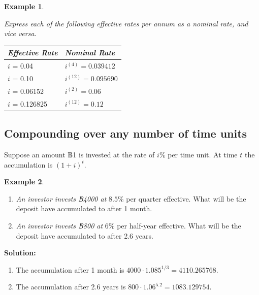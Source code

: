 \documentclass[
]{book}
\theoremstyle{definition}
\theoremstyle{definition}
\newtheorem{example}{Example}[chapter]
\theoremstyle{definition}
\theoremstyle{definition}
\theoremstyle{remark}
\begin{document}
\begin{example}
\protect\hypertarget{exm:unlabeled-div-14}{}\label{exm:unlabeled-div-14}

\emph{Express each of the following effective rates per annum as a nominal
rate, and vice versa.}

\begin{longtable}[]{@{}ll@{}}
\toprule
\textbf{\emph{Effective Rate}} & \textbf{\emph{Nominal Rate}} \\
\midrule
\endhead
\(i\) = 0.04 & \(i^{(4)} = 0.039412\) \\
\(i\) = 0.10 & \(i^{(12)} = 0.095690\) \\
\(i\) = 0.06152 & \(i^{(2)} = 0.06\) \\
\(i\) = 0.126825 & \(i^{(12)} = 0.12\) \\
\bottomrule
\end{longtable}

\end{example}

\hypertarget{compounding-over-any-number-of-time-units}{%
\subsection{Compounding over any number of time units}\label{compounding-over-any-number-of-time-units}}

Suppose an amount ฿1 is invested at the rate of \(i\)\% per time unit. At
time \(t\) the accumulation is \((1 + i)^t\).

\begin{example}
\protect\hypertarget{exm:unlabeled-div-15}{}\label{exm:unlabeled-div-15}

\begin{enumerate}
\def\labelenumi{\arabic{enumi}.}
\item
  \emph{An investor invests ฿4000 at} \(8.5\)\% per quarter effective. What
  will be the deposit have accumulated to after 1 month.
\item
  \emph{An investor invests ฿800 at} \(6\)\% per half-year effective. What
  will be the deposit have accumulated to after 2.6 years.
\end{enumerate}

\end{example}

\textbf{Solution:}

\begin{enumerate}
\def\labelenumi{\arabic{enumi}.}
\item
  The accumulation after 1 month is
  \(4000 \cdot 1.085^{1/3} = 4110.265768.\)
\item
  The accumulation after 2.6 years is
  \(800 \cdot 1.06^{5.2} = 1083.129754.\)
\end{enumerate}
\end{document}
